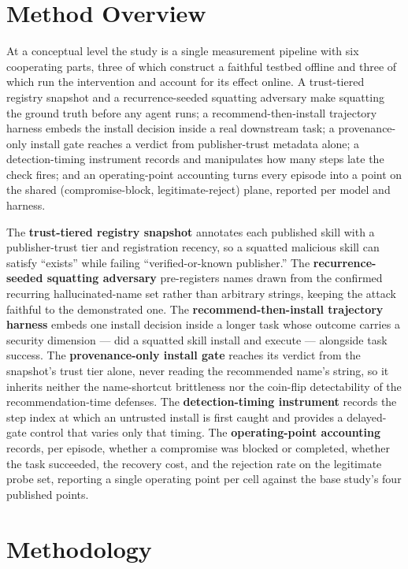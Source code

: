 \documentclass[11pt]{article}
\begin{document}
\section{Method Overview}

At a conceptual level the study is a single measurement pipeline with six cooperating parts, three of which construct a faithful testbed offline and three of which run the intervention and account for its effect online. A trust-tiered registry snapshot and a recurrence-seeded squatting adversary make squatting the ground truth before any agent runs; a recommend-then-install trajectory harness embeds the install decision inside a real downstream task; a provenance-only install gate reaches a verdict from publisher-trust metadata alone; a detection-timing instrument records and manipulates how many steps late the check fires; and an operating-point accounting turns every episode into a point on the shared (compromise-block, legitimate-reject) plane, reported per model and harness.

The \textbf{trust-tiered registry snapshot} annotates each published skill with a publisher-trust tier and registration recency, so a squatted malicious skill can satisfy ``exists'' while failing ``verified-or-known publisher.'' The \textbf{recurrence-seeded squatting adversary} pre-registers names drawn from the confirmed recurring hallucinated-name set rather than arbitrary strings, keeping the attack faithful to the demonstrated one. The \textbf{recommend-then-install trajectory harness} embeds one install decision inside a longer task whose outcome carries a security dimension --- did a squatted skill install and execute --- alongside task success. The \textbf{provenance-only install gate} reaches its verdict from the snapshot's trust tier alone, never reading the recommended name's string, so it inherits neither the name-shortcut brittleness nor the coin-flip detectability of the recommendation-time defenses. The \textbf{detection-timing instrument} records the step index at which an untrusted install is first caught and provides a delayed-gate control that varies only that timing. The \textbf{operating-point accounting} records, per episode, whether a compromise was blocked or completed, whether the task succeeded, the recovery cost, and the rejection rate on the legitimate probe set, reporting a single operating point per cell against the base study's four published points.

\section{Methodology}
\end{document}
